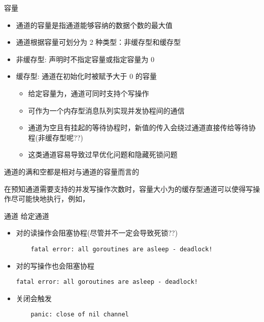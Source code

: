 \begin{frame}{容量}
    \begin{itemize}
        \item 通道的容量是指通道能够容纳的数据个数的最大值
        \item\pause 通道根据容量可划分为 2 种类型：\alert{非缓存型}和\alert{缓存型}
        \item 非缓存型: 声明时不指定容量或指定容量为 0
        \item 缓存型: 通道在初始化时被赋予大于 0 的容量
            \begin{itemize}
                \item 给定容量为，通道可同时支持个写操作
                \item 可作为一个内存型消息队列实现并发协程间的通信
                \item 通道为空且有挂起的等待协程时，新值的传入会绕过通道直接传给等待协程(非缓存型呢??)
                \item 这类通道容易\alert{导致过早优化问题}和\alert{隐藏死锁问题}
            \end{itemize}
    \end{itemize}
    通道的\alert{满}和\alert{空}都是相对与通道的容量而言的 

    \pause\bigskip
    在预知通道需要支持的并发写操作次数时，容量大小为的缓存型通道可以使得写操作尽可能快地执行，例如，
\end{frame}

\begin{frame}[fragile]{通道}
    给定通道
    \begin{itemize}
        \item 对的读操作会阻塞协程(尽管并不一定会导致死锁??)
\begin{lstlisting}
    fatal error: all goroutines are asleep - deadlock!
\end{lstlisting}
        \item 对的写操作也会阻塞协程
\begin{lstlisting}
fatal error: all goroutines are asleep - deadlock!
\end{lstlisting}
        \item 关闭会触发
\begin{lstlisting}
    panic: close of nil channel 
\end{lstlisting}
    \end{itemize}
\end{frame}

